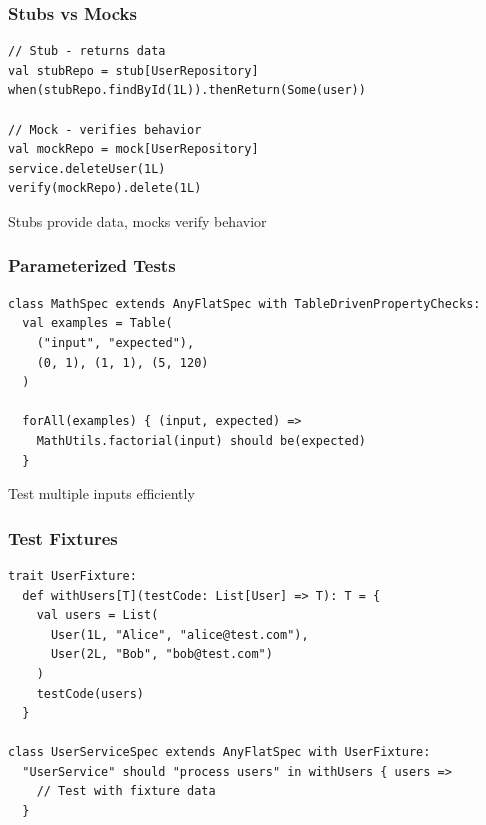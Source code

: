 \documentclass{beamer}
\begin{document}
\begin{frame}[fragile]
\frametitle{Stubs vs Mocks}

\begin{lstlisting}[style=scalaStyle]
// Stub - returns data
val stubRepo = stub[UserRepository]
when(stubRepo.findById(1L)).thenReturn(Some(user))

// Mock - verifies behavior
val mockRepo = mock[UserRepository]
service.deleteUser(1L)
verify(mockRepo).delete(1L)
\end{lstlisting}

Stubs provide data, mocks verify behavior

\end{frame}

\begin{frame}[fragile]
\frametitle{Parameterized Tests}

\begin{lstlisting}[style=scalaStyle]
class MathSpec extends AnyFlatSpec with TableDrivenPropertyChecks:
  val examples = Table(
    ("input", "expected"),
    (0, 1), (1, 1), (5, 120)
  )
  
  forAll(examples) { (input, expected) =>
    MathUtils.factorial(input) should be(expected)
  }
\end{lstlisting}

Test multiple inputs efficiently

\end{frame}

\begin{frame}[fragile]
\frametitle{Test Fixtures}

\begin{lstlisting}[style=scalaStyle]
trait UserFixture:
  def withUsers[T](testCode: List[User] => T): T = {
    val users = List(
      User(1L, "Alice", "alice@test.com"),
      User(2L, "Bob", "bob@test.com")
    )
    testCode(users)
  }

class UserServiceSpec extends AnyFlatSpec with UserFixture:
  "UserService" should "process users" in withUsers { users =>
    // Test with fixture data
  }
\end{lstlisting}

\end{frame}
\end{document}
